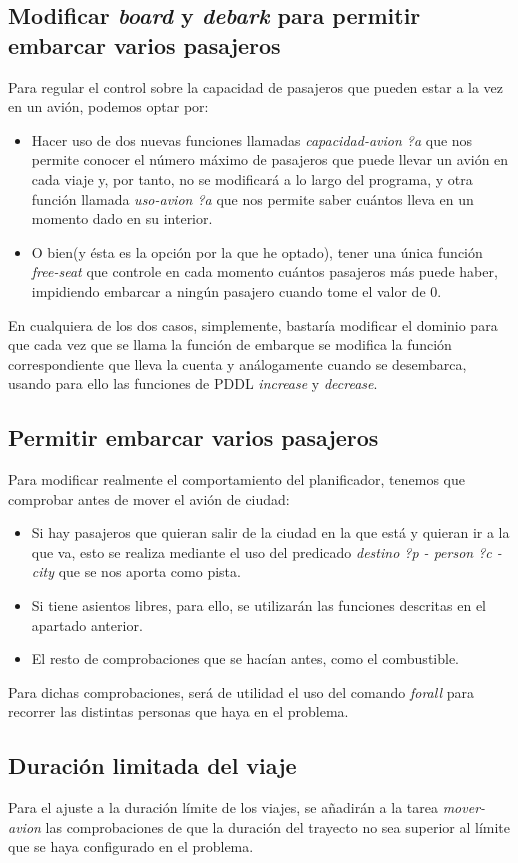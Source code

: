 \documentclass[a4paper, 11pt]{article}
\begin{document}
		\subsection{Modificar \textit{board} y \textit{debark} para permitir embarcar varios pasajeros}
		Para regular el control sobre la capacidad de pasajeros que pueden estar a la vez en un avión,
		podemos optar por:
		\begin{itemize}
			\item Hacer uso de dos nuevas funciones llamadas \textit{capacidad-avion ?a} que nos permite
			conocer el número máximo de pasajeros que puede llevar un avión en cada viaje y, por tanto,
			no se modificará a lo largo del programa, y otra función llamada \textit{uso-avion ?a} que
			nos permite saber cuántos lleva en un momento dado en su interior.
			
			\item O bien(y ésta es la opción por la que he optado), tener una única función
			\textit{free-seat} que controle en cada momento cuántos pasajeros más puede haber, impidiendo
			embarcar a ningún pasajero cuando tome el valor de 0.
		\end{itemize}
		
		En cualquiera de los dos casos, simplemente, bastaría modificar el dominio para que cada vez que
		se llama la función de embarque se modifica la función correspondiente que lleva la cuenta y
		análogamente cuando se desembarca, usando para ello las funciones de PDDL \textit{increase} y
		\textit{decrease}.
	
	\subsection{Permitir embarcar varios pasajeros}
		Para modificar realmente el comportamiento del planificador, tenemos que comprobar antes de mover
		el avión de ciudad:
		\begin{itemize}
			\item Si hay pasajeros que quieran salir de la ciudad en la que está y quieran ir a la que va,
			esto se realiza mediante el uso del predicado \textit{destino ?p - person ?c - city} que se
			nos aporta como pista.
			\item Si tiene asientos libres, para ello, se utilizarán las funciones descritas en el apartado
			anterior.
			\item El resto de comprobaciones que se hacían antes, como el combustible.
		\end{itemize}
		
		Para dichas comprobaciones, será de utilidad el uso del comando \textit{forall} para recorrer las
		distintas personas que haya en el problema.
		
	\subsection{Duración limitada del viaje}
		Para el ajuste a la duración límite de los viajes, se añadirán a la tarea \textit{mover-avion} las
		comprobaciones de que la duración del trayecto no sea superior al límite que se haya configurado en
		el problema.
\end{document}
